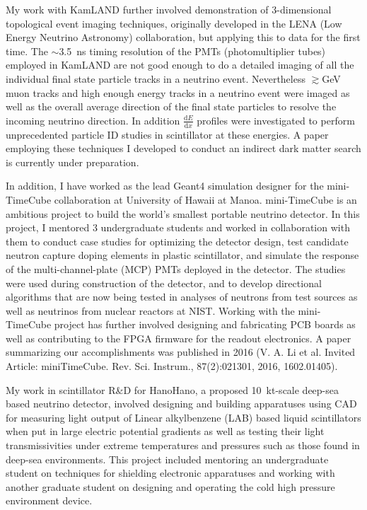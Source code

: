\documentclass[10pt]{article} %
\begin{document}
My work with KamLAND further involved demonstration of 3-dimensional
topological event imaging techniques, originally developed in the LENA (Low
Energy Neutrino Astronomy) collaboration, but applying this to data for the
first time. The $\sim$\SI{3.5}{\nano\second} timing resolution of the PMTs
(photomultiplier tubes) employed in KamLAND are not good enough to do a
detailed imaging of all the individual final state particle tracks in a
neutrino event. Nevertheless $\gtrsim$\si{\giga\electronvolt} muon tracks and
high enough energy tracks in a neutrino event were imaged as well as the
overall average direction of the final state particles to resolve the incoming
neutrino direction. In addition $\frac{\mathrm{d}E}{\mathrm{d}x}$ profiles were
investigated to perform unprecedented particle ID studies in scintillator at
these energies. A paper employing these techniques I developed to conduct an
indirect dark matter search is currently under preparation.

In addition, I have worked as the lead Geant4 simulation designer for the
mini-TimeCube collaboration at University of Hawaii at Manoa. mini-TimeCube is
an ambitious project to build the world's smallest portable neutrino detector.
In this project, I mentored 3 undergraduate students and worked in
collaboration with them to conduct case studies for optimizing the detector
design, test candidate neutron capture doping elements in plastic scintillator,
and simulate the response of the multi-channel-plate (MCP) PMTs deployed in the
detector. The studies were used during construction of the detector, and to
develop directional algorithms that are now being tested in analyses of
neutrons from test sources as well as neutrinos from nuclear reactors at NIST.
Working with the mini-TimeCube project has further involved designing and
fabricating PCB boards as well as contributing to the FPGA firmware for the
readout electronics. A paper summarizing our accomplishments was published in
2016 (V. A. Li et al. Invited Article: miniTimeCube. Rev. Sci. Instrum.,
87(2):021301, 2016, 1602.01405).

My work in scintillator R\&D for HanoHano, a proposed
\SI{10}{\kilo\tonne}-scale deep-sea based neutrino detector, involved designing
and building apparatuses using CAD for measuring light output of Linear
alkylbenzene (LAB) based liquid scintillators when put in large electric
potential gradients as well as testing their light transmissivities under
extreme temperatures and pressures such as those found in deep-sea
environments. This project included mentoring an undergraduate student on
techniques for shielding electronic apparatuses and working with another
graduate student on designing and operating the cold high pressure environment
device.
\end{document}
